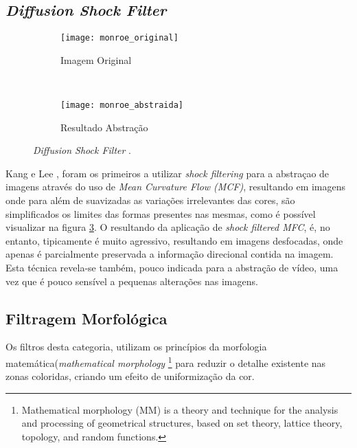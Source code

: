 \subsection{\textit{Diffusion Shock Filter}}
\begin{figure}
        \centering
        \begin{subfigure}[b]{0.3\textwidth}
                \centering
                \texttt{[image: monroe\_original]}
                \caption{Imagem Original}
                \label{fig:monroe_original}
        \end{subfigure}%
        ~ %
        \begin{subfigure}[b]{0.3\textwidth}
                \centering
                \texttt{[image: monroe\_abstraida]}
                \caption{Resultado Abstração}
                \label{fig:monroe_abstraida}
        \end{subfigure}
        \caption{\textit{Diffusion Shock Filter} \cite{Kang2008}.}\label{fig:diffusion_shock_filter}
\end{figure}
Kang e Lee \cite{Kang2008}, foram os primeiros a utilizar \textit{shock filtering} para a abstraçao de imagens através do uso de \textit{Mean Curvature Flow (MCF)}, resultando em imagens onde para além de suavizadas as variações irrelevantes das cores, são simplificados os limites das formas presentes nas mesmas, como é possível visualizar na figura \ref{fig:diffusion_shock_filter}. O resultando da aplicação de \textit{shock filtered MFC}, é, no entanto, tipicamente é muito agressivo, resultando em imagens desfocadas, onde apenas é parcialmente preservada a  informação direcional contida na imagem. Esta técnica revela-se também, pouco indicada para a abstração de vídeo, uma vez que é pouco sensível a pequenas alterações nas imagens.

\subsection{Filtragem Morfológica}
Os filtros desta categoria, utilizam os princípios da morfologia matemática(\textit{mathematical morphology} \footnote{Mathematical morphology (MM) is a theory and technique for the analysis and processing of geometrical structures, based on set theory, lattice theory, topology, and random functions.} para reduzir o detalhe existente nas zonas coloridas, criando um efeito de uniformização da cor.

